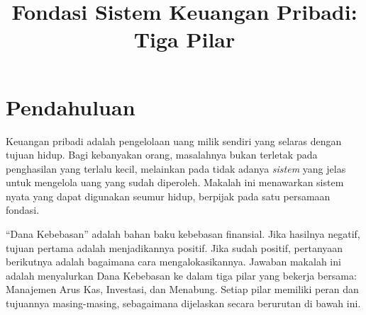 \documentclass[10pt,a4paper,twocolumn]{article}
\title{\vspace{-1.5em}\bfseries\color{accent}\Large Fondasi Sistem Keuangan Pribadi: Tiga Pilar}
\author{}
\date{}
\begin{document}

\section{Pendahuluan}
Keuangan pribadi adalah pengelolaan uang milik sendiri yang selaras dengan tujuan hidup. Bagi kebanyakan orang, masalahnya bukan terletak pada penghasilan yang terlalu kecil, melainkan pada tidak adanya \textit{sistem} yang jelas untuk mengelola uang yang sudah diperoleh. Makalah ini menawarkan sistem nyata yang dapat digunakan seumur hidup, berpijak pada satu persamaan fondasi.

\begin{center}
{\setlength{\fboxsep}{10pt}}
\end{center}

``Dana Kebebasan'' adalah bahan baku kebebasan finansial. Jika hasilnya negatif, tujuan pertama adalah menjadikannya positif. Jika sudah positif, pertanyaan berikutnya adalah bagaimana cara mengalokasikannya. Jawaban makalah ini adalah menyalurkan Dana Kebebasan ke dalam tiga pilar yang bekerja bersama: Manajemen Arus Kas, Investasi, dan Menabung. Setiap pilar memiliki peran dan tujuannya masing-masing, sebagaimana dijelaskan secara berurutan di bawah ini.
\end{document}
